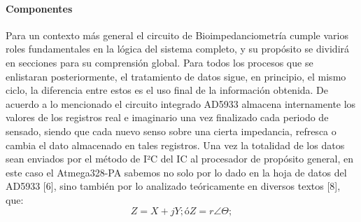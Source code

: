 \documentclass[12pt,letterpaper,spanish]{article}
\begin{document}
				\paragraph{Componentes}
				\hfill\break
Para un contexto más general el circuito de Bioimpedanciometría cumple varios roles fundamentales en la lógica del sistema completo,  y su propósito se dividirá en secciones  para su comprensión global.
Para todos los procesos que se enlistaran posteriormente, el tratamiento de datos sigue, en principio, el mismo ciclo, la diferencia entre estos es el uso final de la información obtenida.
De acuerdo a lo mencionado el circuito integrado AD5933 almacena internamente los valores de los registros real e imaginario una vez finalizado cada periodo de sensado, siendo que cada nuevo senso sobre una cierta impedancia, refresca o cambia el dato almacenado en tales registros.
Una vez la totalidad de los datos sean enviados por el método de I²C  del IC al procesador de propósito general, en este caso el Atmega328-PA sabemos no solo por lo dado en la hoja de datos del AD5933 [6], sino también por lo analizado teóricamente en diversos textos [8], que:
$$Z = X + jY; ó Z = r \angle \Theta;$$								
			
\end{document}
